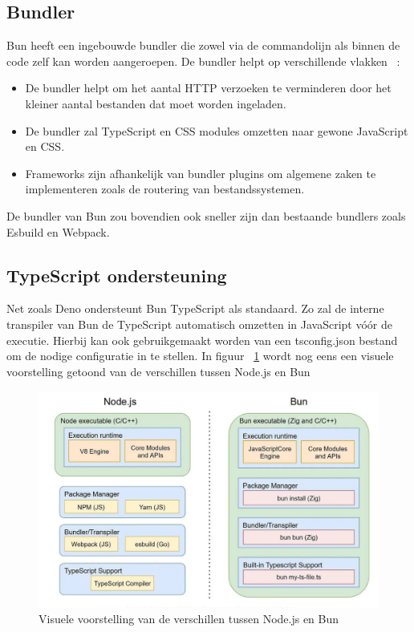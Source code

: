 \subsection{Bundler}
Bun heeft een ingebouwde bundler die zowel via de commandolijn als binnen de code zelf kan worden aangeroepen. 
De bundler helpt op verschillende vlakken ~\autocite{McDonnel2023}:
\begin{itemize}
    \item De bundler helpt om het aantal HTTP verzoeken te verminderen door het kleiner aantal bestanden dat moet worden ingeladen.
    \item De bundler zal TypeScript en CSS modules omzetten naar gewone JavaScript en CSS. 
    \item Frameworks zijn afhankelijk van bundler plugins om algemene zaken te implementeren zoals de routering van bestandssystemen.
\end{itemize}
De bundler van Bun zou bovendien ook sneller zijn dan bestaande bundlers zoals Esbuild en Webpack.

\subsection{TypeScript ondersteuning}
Net zoals Deno ondersteunt Bun TypeScript als standaard. 
Zo zal de interne transpiler van Bun de TypeScript automatisch omzetten in JavaScript vóór de executie.
Hierbij kan ook gebruikgemaakt worden van een tsconfig.json bestand om de nodige configuratie in te stellen.
In figuur ~\ref{fig:nodevbun} wordt nog eens een visuele voorstelling getoond van de verschillen tussen Node.js en Bun

\begin{figure}[H]
    \centering
    \includegraphics[width=.9\textwidth]{graphics/nodevbun.png}
    \caption{\label{fig:nodevbun}Visuele voorstelling van de verschillen tussen Node.js en Bun ~\autocite{Aghdasi2023}}
\end{figure}

